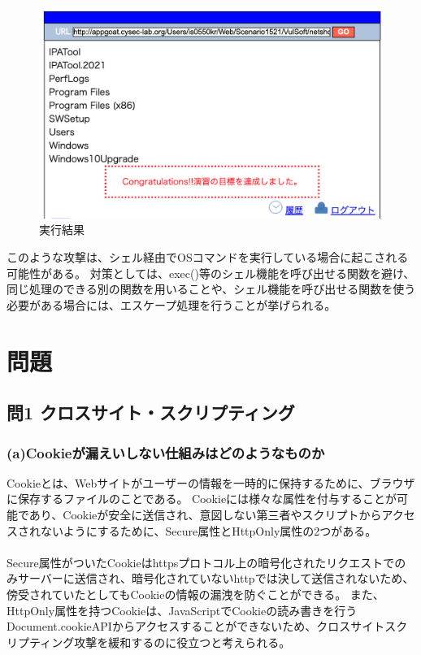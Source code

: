 \documentclass[dvipdfmx,autodetect-engine,titlepage]{jsarticle}
\begin{document}
\begin{figure}[H]
  \centering
  \includegraphics[scale=0.32]{os3.png}
  \caption{実行結果}\label{fig:図39}
\end{figure}


このような攻撃は、シェル経由でOSコマンドを実行している場合に起こされる可能性がある。
対策としては、exec()等のシェル機能を呼び出せる関数を避け、同じ処理のできる別の関数を用いることや、シェル機能を呼び出せる関数を使う必要がある場合には、エスケープ処理を行うことが挙げられる。\\


\section{問題}
\subsection{問1 クロスサイト・スクリプティング}
\subsubsection{(a)Cookieが漏えいしない仕組みはどのようなものか}
Cookieとは、Webサイトがユーザーの情報を一時的に保持するために、ブラウザに保存するファイルのことである。
Cookieには様々な属性を付与することが可能であり、Cookieが安全に送信され、意図しない第三者やスクリプトからアクセスされないようにするために、Secure属性とHttpOnly属性の2つがある。\\\\
Secure属性がついたCookieはhttpsプロトコル上の暗号化されたリクエストでのみサーバーに送信され、暗号化されていないhttpでは決して送信されないため、傍受されていたとしてもCookieの情報の漏洩を防ぐことができる。
また、HttpOnly属性を持つCookieは、JavaScriptでCookieの読み書きを行うDocument.cookieAPIからアクセスすることができないため、クロスサイトスクリプティング攻撃を緩和するのに役立つと考えられる。\\
\end{document}
